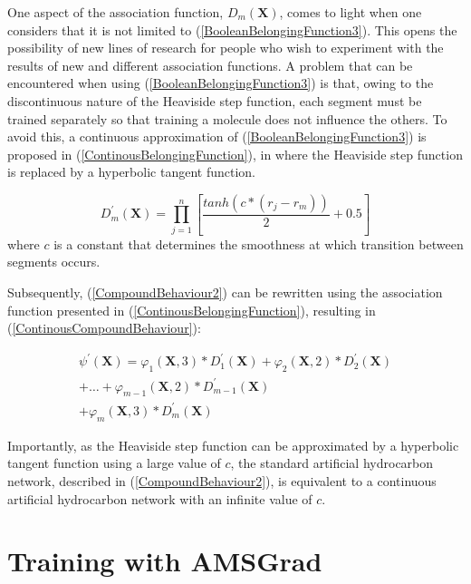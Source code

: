 \documentclass{ieeeaccess}
\begin{document}
One aspect of the association function, \(D_m(\mathbf{X})\), comes to light when one considers that it is not limited to (\ref{BooleanBelongingFunction3}). This opens the possibility of new lines of research for people who wish to experiment with the results of new and different association functions. A problem that can be encountered when using (\ref{BooleanBelongingFunction3}) is that, owing to the discontinuous nature of the Heaviside step function, each segment must be trained separately so that training a molecule does not influence the others. To avoid this, a continuous approximation of (\ref{BooleanBelongingFunction3}) is proposed in (\ref{ContinousBelongingFunction}), in where the Heaviside step function is replaced by a hyperbolic tangent function.

\begin{equation}\label{ContinousBelongingFunction}
 D_m^\prime\left(\mathbf{X}\right)=\prod_{j=1}^{n}\left[\frac{tanh\left(c\ast\left(r_j-r_m\right)\right)}{2}+0.5\right]
\end{equation}
where \(c\) is a constant that determines the smoothness at which transition between segments occurs.

Subsequently, (\ref{CompoundBehaviour2}) can be rewritten using the association function presented in (\ref{ContinousBelongingFunction}), resulting in (\ref{ContinousCompoundBehaviour}):

\begin{equation}\label{ContinousCompoundBehaviour}
\begin{matrix}
\psi^\prime(\mathbf{X})=\varphi_1\left(\mathbf{X},3\right)\ast D_1^\prime\left(\mathbf{X}\right)+\varphi_2\left(\mathbf{X},2\right)\ast D_2^\prime\left(\mathbf{X}\right)\\
+\ldots+\varphi_{m-1}\left(\mathbf{X},2\right)\ast D_{m-1}^\prime\left(\mathbf{X}\right)\\
+\varphi_m\left(\mathbf{X},3\right)\ast D_m^\prime\left(\mathbf{X}\right)
\end{matrix}
\end{equation}

Importantly, as the Heaviside step function can be approximated by a hyperbolic tangent function using a large value of \(c\), the standard artificial hydrocarbon network, described in (\ref{CompoundBehaviour2}), is equivalent to a continuous artificial hydrocarbon network with an infinite value of \(c\).

\section{Training with AMSGrad}
\label{sec:training}
\end{document}
